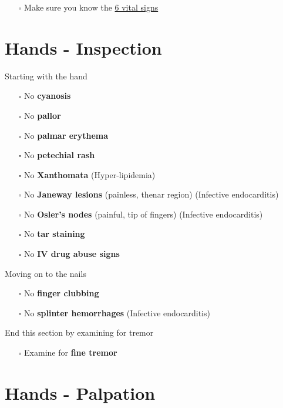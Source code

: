 \documentclass[
  13.5pt,
  a4paper,
  DIV=11,
  numbers=noendperiod]{scrreprt}
\providecommand{\tightlist}{%
  \setlength{\itemsep}{0pt}\setlength{\parskip}{0pt}}
\begin{document}
\begin{itemize}
\tightlist
\item[$\square$]
  Make sure you know the \href{miscellaneous.qmd}{6 vital signs}
\end{itemize}

\section{Hands - Inspection}\label{hands---inspection}

Starting with the hand

\begin{itemize}
\tightlist
\item[$\square$]
  No \textbf{cyanosis}
\item[$\square$]
  No \textbf{pallor}
\item[$\square$]
  No \textbf{palmar erythema}
\item[$\square$]
  No \textbf{petechial rash}
\item[$\square$]
  No \textbf{Xanthomata} (Hyper-lipidemia)
\item[$\square$]
  No \textbf{Janeway lesions} (painless, thenar region) (Infective
  endocarditis)
\item[$\square$]
  No \textbf{Osler's nodes} (painful, tip of fingers) (Infective
  endocarditis)
\item[$\square$]
  No \textbf{tar staining}
\item[$\square$]
  No \textbf{IV drug abuse signs}
\end{itemize}

Moving on to the nails

\begin{itemize}
\tightlist
\item[$\square$]
  No \textbf{finger clubbing}
\item[$\square$]
  No \textbf{splinter hemorrhages} (Infective endocarditis)
\end{itemize}

End this section by examining for tremor

\begin{itemize}
\tightlist
\item[$\square$]
  Examine for \textbf{fine tremor}
\end{itemize}

\section{Hands - Palpation}\label{hands---palpation}
\end{document}

